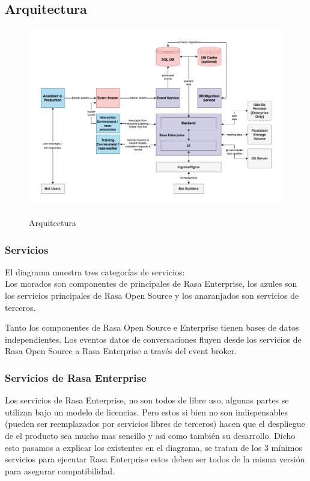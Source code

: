 \subsection{Arquitectura}

\begin{figure}[h]
	\centering
	\includegraphics[width=\textwidth]{imagenes/cap3/architecture_deploy.png}
	\caption{Arquitectura}
	\label{fig:deploy-architecture}
	\cite{Rasa}
\end{figure}
\subsubsection{Servicios}
El diagrama muestra tres categorías de servicios:\\Los morados son componentes de principales de
Rasa
Enterprise, los azules son los servicios principales de Rasa Open Source y los anaranjados son
servicios
de terceros.

Tanto los componentes de Rasa Open Source e Enterprise tienen bases de datos independientes. Los
eventos
datos de conversaciones fluyen desde los servicios de Rasa Open Source a Rasa Enterprise a través
del event broker.

\subsubsection{Servicios de Rasa Enterprise}

Los servicios de Rasa Enterprise, no son todos de libre uso, algunas partes se utilizan bajo un
modelo de
licencias. Pero estos si bien no son indispensables (pueden ser reemplazados por servicios libres
de terceros) hacen que el despliegue de el producto sea mucho mas sencillo y así como también su
desarrollo. Dicho esto pasamos a explicar los existentes en el diagrama, se tratan de los 3 mínimos
servicios para
ejecutar Rasa Enterprise estos deben ser todos de la misma versión para asegurar compatibilidad.

